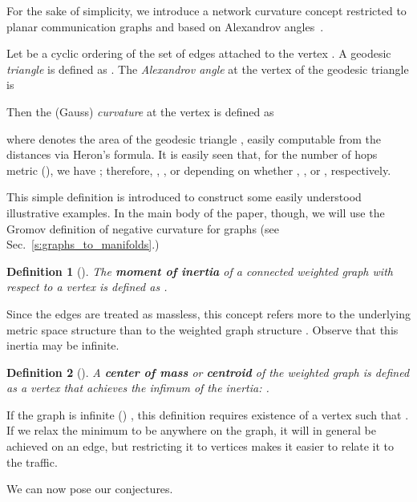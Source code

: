 \documentclass{article}
\newtheorem{definition}{Definition}
\begin{document}
For the sake of simplicity, 
we introduce a network curvature concept restricted to planar communication graphs 
and based on Alexandrov angles~\cite{BridsonHaefliger1999}. 

Let  be a cyclic ordering of the set of edges attached to the vertex . A geodesic \textit{triangle} is defined as . The \textit{Alexandrov angle}  at the vertex  of the geodesic triangle  is

 
Then the (Gauss) \textit{curvature} at the vertex   is defined as 

 
where  denotes the area of the geodesic triangle , 
easily computable from the distances via Heron's formula. It is easily seen that, for the number of hops metric (), 
we have ; therefore, ,  , or  depending on whether , , or , respectively. 

This simple definition is introduced to construct some easily understood illustrative examples. 
In the main body of the paper, though, 
we will use the Gromov definition of negative curvature for graphs   
(see Sec.~\ref{s:graphs_to_manifolds}.)

\begin{definition}[\cite{Jost1997}]
\label{d:inertia}
The \textit{\textbf{moment of inertia}} of a connected weighted graph  
with respect to a vertex  is defined as 
. 
\end{definition}

\noindent
Since the edges are treated as massless, this concept refers more to the underlying metric space structure  
than to the weighted graph structure . 
Observe that this inertia may be infinite. 

\begin{definition}[\cite{Jost1997}]
\label{d:center_of_mass}
A \textit{\textbf{center of mass}} or \textit{\textbf{centroid}} of the weighted graph  is defined as a vertex 
that achieves the infimum of the inertia: . 
\end{definition}
\noindent
If the graph is infinite () , this definition requires existence 
of a vertex  such that . If we relax the minimum to be anywhere on the graph, 
it will in general be achieved on an edge, but restricting it to vertices makes it easier to relate it to the traffic. 

We can now pose our conjectures.
\end{document}
